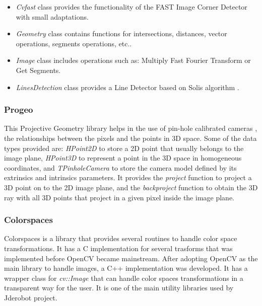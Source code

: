 \documentclass[twocolumn]{svjour3}          %
\begin{document}
\begin{itemize} 
\item \textit{Cvfast} class provides the functionality of the FAST Image Corner Detector with small adaptations.
\item \textit{Geometry} class contains functions for intersections, distances, vector operations, segments operations, etc..
\item \textit{Image} class includes operations such as: Multiply Fast Fourier Transform or Get Segments.
\item \textit{LinesDetection} class provides a Line Detector based on Solis algorithm \cite{solis09}.
\end{itemize}

\subsubsection{Progeo}
\label{subsec:progeo}

This Projective Geometry library helps in the use of pin-hole calibrated cameras%
, the relationships between the pixels and the points in 3D space. Some of the data types provided are: \textit{HPoint2D} to store a 2D point that usually belongs to the image plane, \textit{HPoint3D} to represent a point in the 3D space in homogeneous coordinates, and \textit{TPinholeCamera} to store the camera model defined by its extrinsics and intrinsics parameters. It provides the \textit{project} function to project a 3D point on to the 2D image plane, and the \textit{backproject} function to obtain the 3D ray with all 3D points that project in a given pixel inside the image plane.



\subsubsection{Colorspaces}
\label{subsec:colorspaces}
Colorspaces is a library that provides several routines to handle color space transformations. It has a C implementation for several trasforms that was implemented before OpenCV became mainstream. After adopting OpenCV as the main library to handle images, a C++ implementation was developed. It has a wrapper class for \textit{cv::Image} that can handle color spaces transformations in a transparent way for the user. It is one of the main utility libraries used by Jderobot project.
\end{document}
